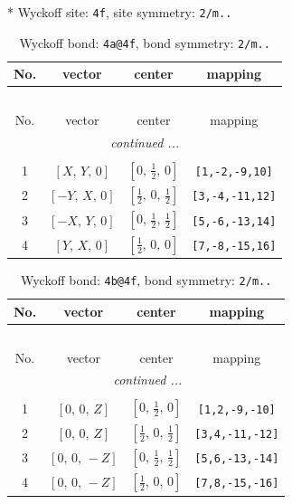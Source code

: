 \documentclass[fleqn,8pt]{jsarticle}
\begin{document}
* Wyckoff site: {\tt 4f}, site symmetry: {\tt 2/m..}
\renewcommand{\arraystretch}{1.2}
\begin{longtable}{cccc}
\caption{Wyckoff bond: {\tt 4a@4f}, bond symmetry: {\tt 2/m..}}
 \\
 \hline \hline
No. & vector & center & mapping \\ \hline \endfirsthead

\multicolumn{3}{l}{\tablename\ \thetable{}} \\
 \hline \hline
No. & vector & center & mapping \\ \hline \endhead

 \hline \hline
\multicolumn{3}{r}{\footnotesize\it continued ...} \\ \endfoot

 \hline \hline
\multicolumn{3}{r}{} \\ \endlastfoot

1 & $\left[ X,\, Y,\, 0 \right]$ & $\left[ 0,\, \frac{1}{2},\, 0 \right]$ & {\tt [1,-2,-9,10]} \\ \hline
2 & $\left[ - Y,\, X,\, 0 \right]$ & $\left[ \frac{1}{2},\, 0,\, \frac{1}{2} \right]$ & {\tt [3,-4,-11,12]} \\ \hline
3 & $\left[ - X,\, Y,\, 0 \right]$ & $\left[ 0,\, \frac{1}{2},\, \frac{1}{2} \right]$ & {\tt [5,-6,-13,14]} \\ \hline
4 & $\left[ Y,\, X,\, 0 \right]$ & $\left[ \frac{1}{2},\, 0,\, 0 \right]$ & {\tt [7,-8,-15,16]} \\
\end{longtable}
\renewcommand{\arraystretch}{1.2}
\begin{longtable}{cccc}
\caption{Wyckoff bond: {\tt 4b@4f}, bond symmetry: {\tt 2/m..}}
 \\
 \hline \hline
No. & vector & center & mapping \\ \hline \endfirsthead

\multicolumn{3}{l}{\tablename\ \thetable{}} \\
 \hline \hline
No. & vector & center & mapping \\ \hline \endhead

 \hline \hline
\multicolumn{3}{r}{\footnotesize\it continued ...} \\ \endfoot

 \hline \hline
\multicolumn{3}{r}{} \\ \endlastfoot

1 & $\left[ 0,\, 0,\, Z \right]$ & $\left[ 0,\, \frac{1}{2},\, 0 \right]$ & {\tt [1,2,-9,-10]} \\ \hline
2 & $\left[ 0,\, 0,\, Z \right]$ & $\left[ \frac{1}{2},\, 0,\, \frac{1}{2} \right]$ & {\tt [3,4,-11,-12]} \\ \hline
3 & $\left[ 0,\, 0,\, - Z \right]$ & $\left[ 0,\, \frac{1}{2},\, \frac{1}{2} \right]$ & {\tt [5,6,-13,-14]} \\ \hline
4 & $\left[ 0,\, 0,\, - Z \right]$ & $\left[ \frac{1}{2},\, 0,\, 0 \right]$ & {\tt [7,8,-15,-16]} \\
\end{longtable}
\end{document}

